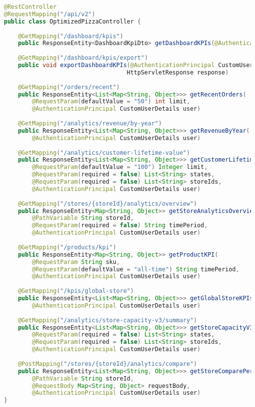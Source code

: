 \documentclass[11pt,a4paper]{article}
\begin{document}
\begin{lstlisting}[language=java, caption=Business Endpoints]
@RestController 
@RequestMapping("/api/v2")
public class OptimizedPizzaController {
    
    @GetMapping("/dashboard/kpis")
    public ResponseEntity<DashboardKpiDto> getDashboardKPIs(@AuthenticationPrincipal CustomUserDetails user)
    
    @GetMapping("/dashboard/kpis/export")
    public void exportDashboardKPIs(@AuthenticationPrincipal CustomUserDetails user, 
                                   HttpServletResponse response)
    
    @GetMapping("/orders/recent")
    public ResponseEntity<List<Map<String, Object>>> getRecentOrders(
        @RequestParam(defaultValue = "50") int limit,
        @AuthenticationPrincipal CustomUserDetails user)
    
    @GetMapping("/analytics/revenue/by-year")
    public ResponseEntity<List<Map<String, Object>>> getRevenueByYear(
        @AuthenticationPrincipal CustomUserDetails user)
    
    @GetMapping("/analytics/customer-lifetime-value")
    public ResponseEntity<List<Map<String, Object>>> getCustomerLifetimeValue(
        @RequestParam(defaultValue = "100") Integer limit,
        @RequestParam(required = false) List<String> states,
        @RequestParam(required = false) List<String> storeIds,
        @AuthenticationPrincipal CustomUserDetails user)
    
    @GetMapping("/stores/{storeId}/analytics/overview")
    public ResponseEntity<Map<String, Object>> getStoreAnalyticsOverview(
        @PathVariable String storeId,
        @RequestParam(required = false) String timePeriod,
        @AuthenticationPrincipal CustomUserDetails user)
    
    @GetMapping("/products/kpi")
    public ResponseEntity<Map<String, Object>> getProductKPI(
        @RequestParam String sku,
        @RequestParam(defaultValue = "all-time") String timePeriod,
        @AuthenticationPrincipal CustomUserDetails user)
    
    @GetMapping("/kpis/global-store")
    public ResponseEntity<List<Map<String, Object>>> getGlobalStoreKPIs(
        @AuthenticationPrincipal CustomUserDetails user)
    
    @GetMapping("/analytics/store-capacity-v3/summary")
    public ResponseEntity<List<Map<String, Object>>> getStoreCapacityV3Summary(
        @RequestParam(required = false) List<String> states,
        @RequestParam(required = false) List<String> storeIds,
        @AuthenticationPrincipal CustomUserDetails user)
    
    @PostMapping("/stores/{storeId}/analytics/compare")
    public ResponseEntity<List<Map<String, Object>>> getStoreComparePeriods(
        @PathVariable String storeId,
        @RequestBody Map<String, Object> requestBody,
        @AuthenticationPrincipal CustomUserDetails user)
}
\end{lstlisting}
\end{document}
